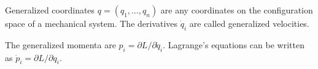 Generalized coordinates $q = (q_1, \ldots, q_n)$ are any coordinates on the configuration space of a mechanical system. The derivatives $\dot{q}_i$ are called generalized velocities.

The generalized momenta are $p_i = \partial L/\partial \dot{q}_i$. Lagrange's equations can be written as $\dot{p}_i = \partial L/\partial q_i$.
